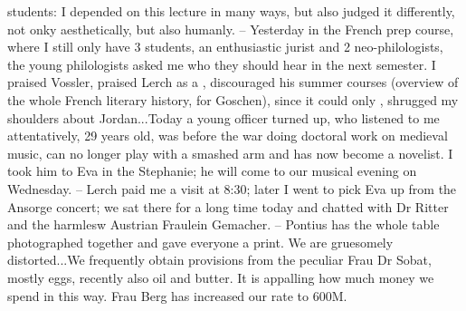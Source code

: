  students: I depended on this lecture in many ways, but also judged it differently, not onky aesthetically, but also humanly. -- Yesterday in the French prep course, where I still only have 3 students, an enthusiastic jurist and 2 neo-philologists, the young philologists asked me who they should hear in the next semester. I praised Vossler, praised Lerch as a , discouraged his summer courses (overview of the whole French literary history, for Goschen), since it could only , shrugged my shoulders about Jordan...Today a young officer turned up, who listened to me attentatively, 29 years old, was before the war doing doctoral work on medieval music, can no longer play with a smashed arm and has now become a novelist. I took him to Eva in the Stephanie; he will come to our musical evening on Wednesday. -- Lerch paid me a visit at 8:30; later I went to pick Eva up from the Ansorge concert; we sat there for a long time today and chatted with Dr Ritter and the harmlesw Austrian Fraulein Gemacher. -- Pontius has the whole table photographed together and gave everyone a print. We are gruesomely distorted...We frequently obtain provisions from the peculiar Frau Dr Sobat, mostly eggs, recently also oil and butter. It is appalling how much money we spend in this way. Frau Berg has increased our rate to 600M.
 
\missing%